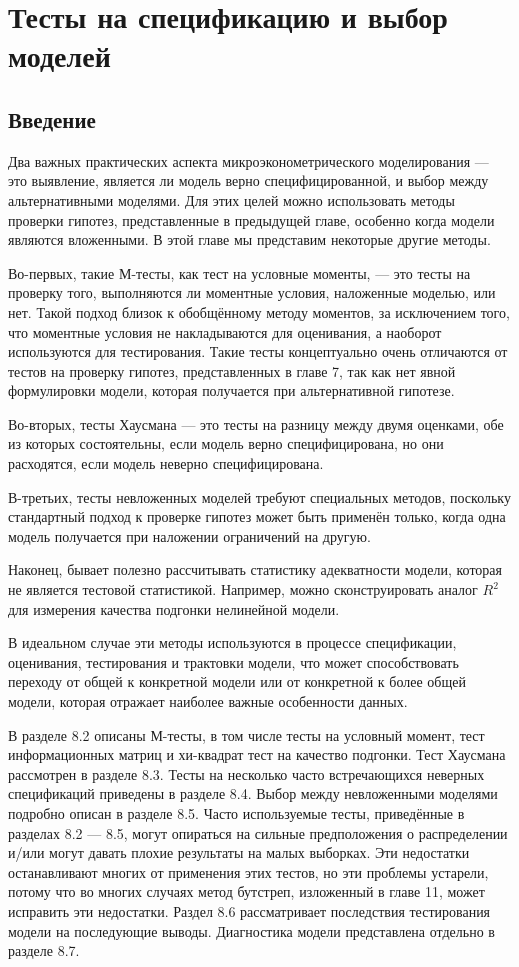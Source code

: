 
\chapter{Тесты на спецификацию и выбор моделей}
\section{Введение}

Два важных практических аспекта микроэконометрического моделирования --- это выявление, является ли модель верно специфицированной, и выбор между альтернативными моделями. Для этих целей можно использовать методы проверки гипотез, представленные в предыдущей главе, особенно когда модели являются вложенными. В этой главе мы представим некоторые другие методы.

Во-первых, такие М-тесты, как тест на условные моменты, --- это тесты на проверку того, выполняются ли моментные условия, наложенные моделью, или нет. Такой подход близок к обобщённому методу моментов, за исключением того, что моментные условия не накладываются для оценивания, а наоборот используются для тестирования. Такие тесты концептуально очень отличаются от тестов на проверку гипотез, представленных в главе 7, так как нет явной формулировки модели, которая получается при альтернативной гипотезе.

Во-вторых, тесты Хаусмана --- это тесты на разницу между двумя оценками, обе из которых состоятельны, если модель верно специфицирована, но они расходятся, если модель неверно специфицирована.

В-третьих, тесты невложенных моделей требуют специальных методов, поскольку стандартный подход к проверке гипотез может быть применён только, когда одна модель получается при наложении ограничений на другую.

Наконец, бывает полезно рассчитывать статистику адекватности модели, которая не является тестовой статистикой. Например, можно сконструировать аналог $R^2$ для измерения качества подгонки нелинейной модели.

В идеальном случае эти методы используются в процессе спецификации, оценивания, тестирования и трактовки модели, что может способствовать переходу от общей к конкретной модели или от конкретной к более общей модели, которая отражает наиболее важные особенности данных.

В разделе 8.2 описаны М-тесты, в том числе тесты на условный момент, тест информационных матриц и хи-квадрат тест на качество подгонки. Тест Хаусмана рассмотрен в разделе 8.3. Тесты на несколько часто встречающихся неверных спецификаций приведены в разделе 8.4. Выбор между невложенными моделями подробно описан в разделе 8.5. Часто используемые тесты, приведённые в разделах 8.2 --- 8.5, могут опираться на сильные предположения о распределении и/или могут давать плохие результаты на малых выборках. Эти недостатки останавливают многих от применения этих тестов, но эти проблемы устарели, потому что во многих случаях метод бутстреп, изложенный в главе 11, может исправить эти недостатки. Раздел 8.6 рассматривает последствия тестирования модели на последующие выводы. Диагностика модели представлена отдельно в разделе 8.7.

